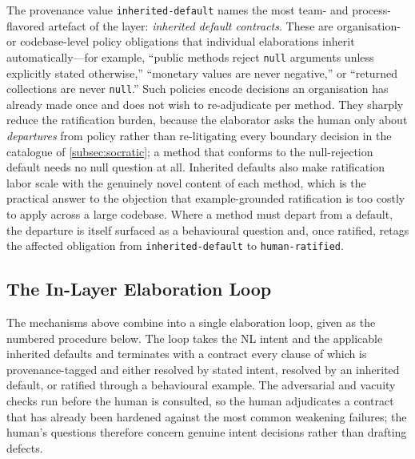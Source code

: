 The provenance value \texttt{inherited-default} names the most team- and process-flavored artefact of the layer: \emph{inherited default contracts}. These are organisation- or codebase-level policy obligations that individual elaborations inherit automatically---for example, ``public methods reject \lstinline|null| arguments unless explicitly stated otherwise,'' ``monetary values are never negative,'' or ``returned collections are never \lstinline|null|.'' Such policies encode decisions an organisation has already made once and does not wish to re-adjudicate per method. They sharply reduce the ratification burden, because the elaborator asks the human only about \emph{departures} from policy rather than re-litigating every boundary decision in the catalogue of \cref{subsec:socratic}; a method that conforms to the null-rejection default needs no null question at all. Inherited defaults also make ratification labor scale with the genuinely novel content of each method, which is the practical answer to the objection that example-grounded ratification is too costly to apply across a large codebase. Where a method must depart from a default, the departure is itself surfaced as a behavioural question and, once ratified, retags the affected obligation from \texttt{inherited-default} to \texttt{human-ratified}.

\subsection{The In-Layer Elaboration Loop}
\label{subsec:elaboration_loop}

The mechanisms above combine into a single elaboration loop, given as the numbered procedure below. The loop takes the NL intent and the applicable inherited defaults and terminates with a contract every clause of which is provenance-tagged and either resolved by stated intent, resolved by an inherited default, or ratified through a behavioural example. The adversarial and vacuity checks run before the human is consulted, so the human adjudicates a contract that has already been hardened against the most common weakening failures; the human's questions therefore concern genuine intent decisions rather than drafting defects.

